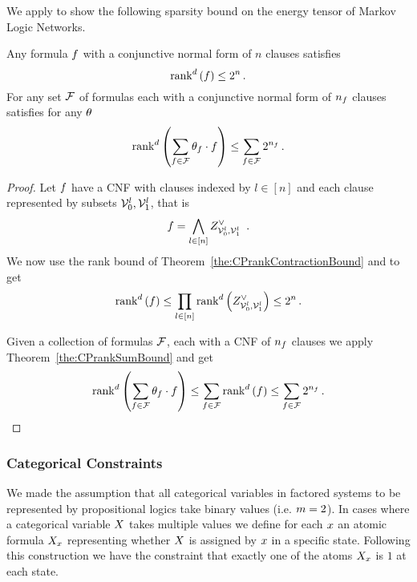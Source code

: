 We apply  to show the following sparsity bound on the energy tensor of Markov Logic Networks.

\begin{theorem}
	Any formula $f$ with a conjunctive normal form of $n$ clauses satisfies
		\[ \mathrm{rank}^{d}\left(f\right) \leq 2^{n} \, . \]
	For any set $\mathcal{F}$ of formulas each with a conjunctive normal form of $n_{f}$ clauses satisfies for any $\theta$
		\[ \mathrm{rank}^{d}\left(\sum_{f\in\mathcal{F}}\theta_{f}\cdot f\right) \leq \sum_{f\in\mathcal{F}}2^{n_{f}} \, . \]
\end{theorem}
\begin{proof}
	Let $f$ have a CNF with clauses indexed by $l\in[n]$ and each clause represented by subsets $\mathcal{V}_0^l, \mathcal{V}_1^l$, that is
		\[ \exformula = \bigwedge_{l \in [n]}  \clauseof{\nodes_0^l}{\nodes_1^l} \, . \]
	We now use the rank bound of Theorem~\ref{the:CPrankContractionBound} and  to get
	\begin{align*}
		\mathrm{rank}^{d}\left(f\right) \leq \prod_{l \in [n]}  \mathrm{rank}^{d}\left(Z^{\lor}_{\mathcal{V}_0^l,\mathcal{V}_1^l}\right) \leq 2^n \, . 
	\end{align*}
	
	Given a collection of formulas $\mathcal{F}$, each with a CNF of $n_{f}$ clauses we apply Theorem~\ref{the:CPrankSumBound} and get
	\begin{align*}
		\mathrm{rank}^{d}\left(\sum_{f\in\mathcal{F}}\theta_{f}\cdot f\right) \leq \sum_{f\in\mathcal{F}}\mathrm{rank}^{d}\left(f\right) \leq \sum_{f\in\mathcal{F}}2^{n_{f}} \, . 
	\end{align*}
\end{proof}


\subsubsection{Categorical Constraints}\label{sec:categoricalTN}

We made the assumption that all categorical variables in factored systems to be represented by propositional logics take binary values (i.e. $m=2$).
In cases where a categorical variable $X$ takes multiple values we define for each $x$ an atomic formula $X_{x}$ representing whether $X$ is assigned by $x$ in a specific state.
Following this construction we have the constraint that exactly one of the atoms $X_{x}$ is $1$ at each state.

